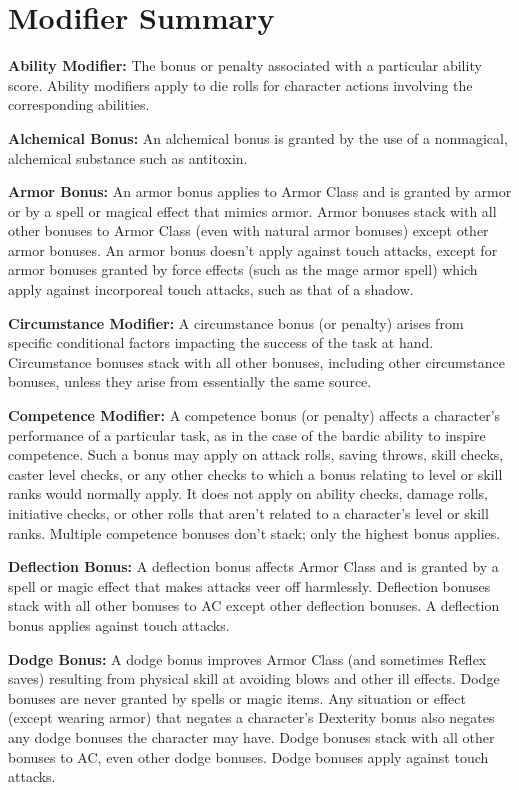 \section{Modifier Summary}
\textbf{Ability Modifier:} The bonus or penalty associated with a particular ability score. Ability modifiers apply to die rolls for character actions involving the corresponding abilities.

\textbf{Alchemical Bonus:} An alchemical bonus is granted by the use of a nonmagical, alchemical substance such as antitoxin.

\textbf{Armor Bonus:} An armor bonus applies to Armor Class and is granted by armor or by a spell or magical effect that mimics armor. Armor bonuses stack with all other bonuses to Armor Class (even with natural armor bonuses) except other armor bonuses. An armor bonus doesn't apply against touch attacks, except for armor bonuses granted by force effects (such as the mage armor spell) which apply against incorporeal touch attacks, such as that of a shadow.

\textbf{Circumstance Modifier:} A circumstance bonus (or penalty) arises from specific conditional factors impacting the success of the task at hand. Circumstance bonuses stack with all other bonuses, including other circumstance bonuses, unless they arise from essentially the same source.

\textbf{Competence Modifier:} A competence bonus (or penalty) affects a character's performance of a particular task, as in the case of the bardic ability to inspire competence. Such a bonus may apply on attack rolls, saving throws, skill checks, caster level checks, or any other checks to which a bonus relating to level or skill ranks would normally apply. It does not apply on ability checks, damage rolls, initiative checks, or other rolls that aren't related to a character's level or skill ranks. Multiple competence bonuses don't stack; only the highest bonus applies.

\textbf{Deflection Bonus:} A deflection bonus affects Armor Class and is granted by a spell or magic effect that makes attacks veer off harmlessly. Deflection bonuses stack with all other bonuses to AC except other deflection bonuses. A deflection bonus applies against touch attacks.

\textbf{Dodge Bonus:} A dodge bonus improves Armor Class (and sometimes Reflex saves) resulting from physical skill at avoiding blows and other ill effects. Dodge bonuses are never granted by spells or magic items. Any situation or effect (except wearing armor) that negates a character's Dexterity bonus also negates any dodge bonuses the character may have. Dodge bonuses stack with all other bonuses to AC, even other dodge bonuses. Dodge bonuses apply against touch attacks.


